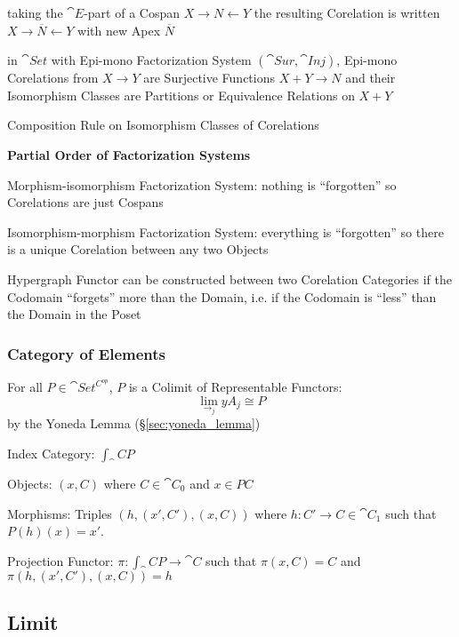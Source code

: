 taking the $\cat{E}$-part of a Cospan $X \rightarrow N \leftarrow Y$
the resulting Corelation is written $X \rightarrow \overline{N}
\leftarrow Y$ with new Apex $\overline{N}$

in $\cat{Set}$ with Epi-mono Factorization System $(\cat{Sur},
\cat{Inj})$, Epi-mono Corelations from $X \rightarrow Y$ are
Surjective Functions $X + Y \rightarrow N$ and their Isomorphism
Classes are Partitions or Equivalence Relations on $X + Y$

Composition Rule on Isomorphism Classes of Corelations %


\textbf{Partial Order of Factorization Systems} %

Morphism-isomorphism Factorization System: nothing is ``forgotten'' so
Corelations are just Cospans

Isomorphism-morphism Factorization System: everything is ``forgotten''
so there is a unique Corelation between any two Objects

Hypergraph Functor can be constructed between two Corelation
Categories if the Codomain ``forgets'' more than the Domain, i.e. if
the Codomain is ``less'' than the Domain in the Poset



\subsubsection{Category of Elements}\label{sec:element_category}

For all $P \in \cat{Set^{C^{op}}}$, $P$ is a Colimit of
Representable Functors:
\[
  \lim_{\rightarrow_j} yA_j \cong P
\]
by the Yoneda Lemma (\S\ref{sec:yoneda_lemma})

Index Category: $\int_\cat{C} P$

Objects: $(x,C)$ where $C \in \cat{C}_0$ and $x \in PC$

Morphisms: Triples $(h, (x',C'), (x,C))$ where $h : C' \rightarrow C
\in \cat{C}_1$ such that $P(h)(x) = x'$.

Projection Functor: $\pi : \int_\cat{C} P \rightarrow \cat{C}$
such that $\pi(x,C) = C$ and $\pi(h, (x',C'), (x,C)) = h$



\subsection{Limit}\label{sec:limit}

